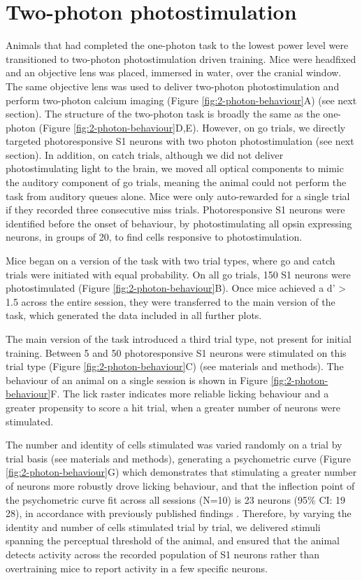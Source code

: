 \section{Two-photon photostimulation}

Animals that had completed the one-photon task to the lowest power level were transitioned to two-photon photostimulation driven training. Mice were headfixed and an objective lens was placed, immersed in water, over the cranial window. The same objective lens was used to deliver two-photon photostimulation and perform two-photon calcium imaging (Figure \ref{fig:2-photon-behaviour}A) (see next section). The structure of the two-photon task is broadly the same as the one-photon (Figure \ref{fig:2-photon-behaviour}D,E). However, on go trials, we directly targeted photoresponsive S1 neurons with two photon photostimulation (see next section). In addition, on catch trials, although we did not deliver photostimulating light to the brain, we moved all optical components to mimic the auditory component of go trials, meaning the animal could not perform the task from auditory queues alone. Mice were only auto-rewarded for a single trial if they recorded three consecutive miss trials. Photoresponsive S1 neurons were identified before the onset of behaviour, by photostimulating all opsin expressing neurons, in groups of 20, to find cells responsive to photostimulation.

Mice began on a version of the task with two trial types, where go and catch trials were initiated with equal probability. On all go trials, 150 S1 neurons were photostimulated (Figure \ref{fig:2-photon-behaviour}B). Once mice achieved a d' > 1.5 across the entire session, they were transferred to the main version of the task, which generated the data included in all further plots.

The main version of the task introduced a third trial type, not present for initial training. Between 5 and 50 photoresponsive S1 neurons were stimulated on this trial type (Figure \ref{fig:2-photon-behaviour}C) (see materials and methods). The behaviour of an animal on a single session is shown in Figure \ref{fig:2-photon-behaviour}F. The lick raster indicates more reliable licking behaviour and a greater propensity to score a hit trial, when a greater number of neurons were stimulated.

The number and identity of cells stimulated was varied randomly on a trial by trial basis (see materials and methods), generating a psychometric curve (Figure \ref{fig:2-photon-behaviour}G) which demonstrates that stimulating a greater number of neurons more robustly drove licking behaviour, and that the inflection point of the psychometric curve fit across all sessions (N=10) is 23 neurons (95\% CI: 19 28), in accordance with previously published findings \cite{dalgleish_how_2020}. Therefore, by varying the identity and number of cells stimulated trial by trial, we delivered stimuli spanning the perceptual threshold of the animal, and ensured that the animal detects activity across the recorded population of S1 neurons rather than overtraining mice to report activity in a few specific neurons.

